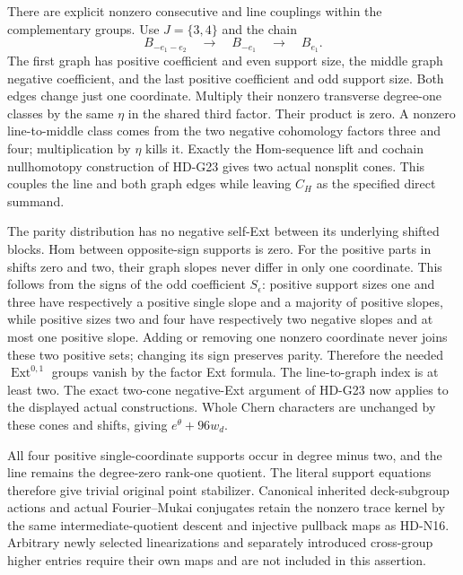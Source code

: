 There are explicit nonzero consecutive and line couplings within
the complementary groups. Use \(J=\{3,4\}\) and the chain
\[
 B_{-e_1-e_2}\quad\longrightarrow\quad B_{-e_1}
                      \quad\longrightarrow\quad B_{e_1}.
\]
The first graph has positive coefficient and even support size,
the middle graph negative coefficient, and the last positive
coefficient and odd support size. Both edges change just one
coordinate. Multiply their nonzero transverse degree-one classes
by the same \(\eta\) in the shared third factor. Their product
is zero. A nonzero line-to-middle class comes from the two negative
cohomology factors three and four; multiplication by \(\eta\)
kills it. Exactly the Hom-sequence lift and cochain nullhomotopy
construction of HD-G23 gives two actual nonsplit cones. This
couples the line and both graph edges while leaving \(C_H\) as
the specified direct summand.

The parity distribution has no negative self-Ext between its
underlying shifted blocks. Hom between opposite-sign supports is
zero. For the positive parts in shifts zero and two, their graph
slopes never differ in only one coordinate. This follows from the
signs of the odd coefficient \(S_\epsilon\): positive support
sizes one and three have respectively a positive single slope
and a majority of positive slopes, while positive sizes two and
four have respectively two negative slopes and at most one positive
slope. Adding or removing one nonzero coordinate never joins these
two positive sets; changing its sign preserves parity. Therefore
the needed \(\operatorname{Ext}^{0,1}\) groups vanish by the
factor Ext formula. The line-to-graph index is at least two.
The exact two-cone negative-Ext argument of HD-G23 now applies
to the displayed actual constructions. Whole Chern characters are
unchanged by these cones and shifts, giving \(e^\theta+96w_d\).

All four positive single-coordinate supports occur in degree minus
two, and the line remains the degree-zero rank-one quotient. The
literal support equations therefore give trivial original point
stabilizer. Canonical inherited deck-subgroup actions and actual
Fourier--Mukai conjugates retain the nonzero trace kernel by the
same intermediate-quotient descent and injective pullback maps as
HD-N16. Arbitrary newly selected linearizations and separately
introduced cross-group higher entries require their own maps and
are not included in this assertion.
